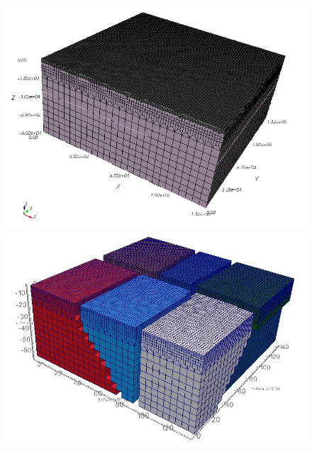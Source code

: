 \documentclass[referee,extra]{gji}
\begin{document}
\begin{figure}
\begin{center}
\begin{minipage}[t]{0.45\textwidth}
\includegraphics[width=1.\textwidth]{./images/2lay_mesh_boundary_fig8.jpg} \\
\includegraphics[width=1.\textwidth]{./images/2lay_mesh_partitions.jpg}
\end{minipage}
\begin{minipage}[t]{0.45\textwidth}

\end{minipage}
\end{center}
\end{figure}
\end{document}
